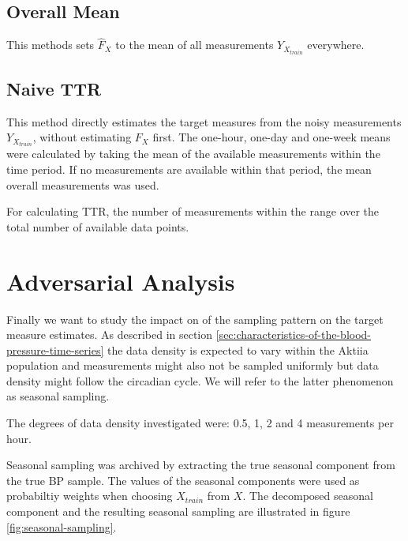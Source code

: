 \subsection{Overall Mean}
This methods sets $\hat{F}_X$ to the mean of all measurements
$Y_{X_{train}}$ everywhere.


\subsection{Naive TTR}
This method directly estimates the target measures
from the noisy measurements $Y_{X_{train}}$, without estimating $F_X$
first.
The one-hour, one-day and one-week means were calculated by
taking the mean of the available measurements within the time period.
If no measurements are available within that period, the mean
overall measurements was used.

For calculating TTR, the number of measurements within the range over
the total number of available data points.



\section{Adversarial Analysis}\label{sec:adversarial-analysis}

Finally we want to study the impact on of the sampling pattern on the
target measure estimates.
As described in section \ref{sec:characteristics-of-the-blood-pressure-time-series}
the data density is expected to vary within the Aktiia population and
measurements might
also not be sampled uniformly but data density might follow the circadian cycle.
We will refer to the latter phenomenon as seasonal sampling.

The degrees of data density investigated were: 0.5, 1, 2 and 4
measurements per hour.

Seasonal sampling was archived by extracting the true seasonal component from
the true BP sample. The values of the seasonal components were used
as probabiltiy weights when choosing $X_{train}$ from $X$. The decomposed
seasonal component and the resulting seasonal sampling are illustrated
in figure \ref{fig:seasonal-sampling}.



